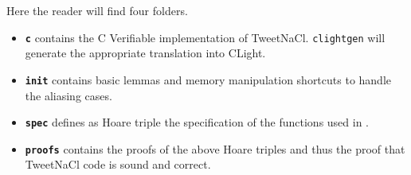 Here the reader will find four folders.
\begin{itemize}
  \item \textbf{\texttt{c}} contains the C Verifiable implementation of TweetNaCl.
  \texttt{clightgen} will generate the appropriate translation into CLight.
  \item \textbf{\texttt{init}} contains basic lemmas and memory manipulation
  shortcuts to handle the aliasing cases.
  \item \textbf{\texttt{spec}} defines as Hoare triple the specification of the
  functions used in .
  \item \textbf{\texttt{proofs}} contains the proofs of the above Hoare triples
  and thus the proof that TweetNaCl code is sound and correct.
\end{itemize}
